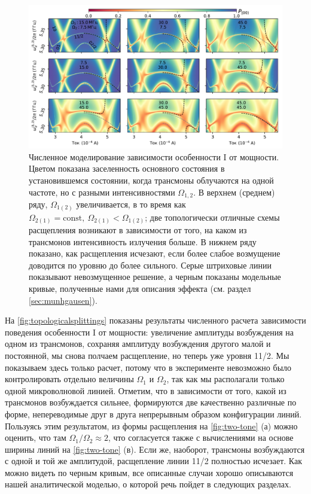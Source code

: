 \documentclass[14pt, a4paper]{extreport}
\numberwithin{equation}{section}
\begin{document}
\begin{figure}
	\includegraphics[width=1\linewidth]{Pictures/topological_splittings}
	\caption{Численное моделирование зависимости особенности I от мощности. Цветом показана заселенность основного состояния в установившемся состоянии, когда трансмоны облучаются на одной частоте, но с разными интенсивностями $\Omega_{1,2}$. В верхнем (среднем) ряду, 
		$\Omega_{1(2)}$ увеличивается, в то время как
		$\Omega_{2(1)} = \text{const},\ \Omega_{2(1)} < 
		\Omega_{1(2)}$; две топологически отличные схемы расщепления возникают в зависимости от того, на каком из трансмонов интенсивность излучения больше. В нижнем ряду показано, как расщепления исчезают, если более слабое возмущение доводится по уровню до более сильного. Серые штриховые линии показывают невозмущенное решение, а черным показаны модельные кривые, полученные нами для описания эффекта (см. раздел \ref{sec:munhgausen}).}
	\label{fig:topologicalsplittings}
\end{figure}

На \autoref{fig:topologicalsplittings} показаны результаты численного расчета зависимости поведения особенности I от мощности: увеличение амплитуды возбуждения на одном из трансмонов, сохраняя амплитуду возбуждения другого малой и постоянной, мы снова полчаем расщепление, но теперь уже уровня 11/2. Мы показываем здесь только расчет, потому что в эксперименте невозможно было контролировать отдельно величины $\Omega_1$ и $\Omega_2$, так как мы располагали только одной микроволновой линией. Отметим, что в зависимости от того, какой из трансмонов возбуждается сильнее, формируются две качественно различные по форме, непереводимые друг в друга непрерывным образом конфигурации линий. Пользуясь этим результатом, из формы расщепления на \autoref{fig:two-tone} (а) можно оценить, что там $\Omega_1/\Omega_2 \approx 2$, что согласуется также с вычислениями на основе ширины линий на \autoref{fig:two-tone} (в). Если же, наоборот, трансмоны возбуждаются с одной и той же амплитудой, расщепление линии 11/2 полностью исчезает. Как можно видеть по черным кривым, все описанные случаи хорошо описываются нашей аналитической моделью, о которой речь пойдет в следующих разделах.
\end{document}

